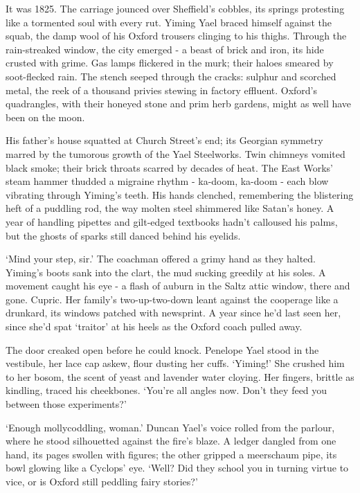 It was 1825. The carriage jounced over Sheffield's cobbles, its springs protesting like a tormented soul with every rut. Yiming Yael braced himself against the squab, the damp wool of his Oxford trousers clinging to his thighs. Through the rain-streaked window, the city emerged - a beast of brick and iron, its hide crusted with grime. Gas lamps flickered in the murk; their haloes smeared by soot-flecked rain. The stench seeped through the cracks: sulphur and scorched metal, the reek of a thousand privies stewing in factory effluent. Oxford's quadrangles, with their honeyed stone and prim herb gardens, might as well have been on the moon.

His father's house squatted at Church Street's end; its Georgian symmetry marred by the tumorous growth of the Yael Steelworks. Twin chimneys vomited black smoke; their brick throats scarred by decades of heat. The East Works' steam hammer thudded a migraine rhythm - ka-doom, ka-doom - each blow vibrating through Yiming's teeth. His hands clenched, remembering the blistering heft of a puddling rod, the way molten steel shimmered like Satan's honey. A year of handling pipettes and gilt-edged textbooks hadn't calloused his palms, but the ghosts of sparks still danced behind his eyelids.

`Mind your step, sir.' The coachman offered a grimy hand as they halted. Yiming's boots sank into the clart, the mud sucking greedily at his soles. A movement caught his eye - a flash of auburn in the Saltz attic window, there and gone. Cupric. Her family's two-up-two-down leant against the cooperage like a drunkard, its windows patched with newsprint. A year since he'd last seen her, since she'd spat `traitor' at his heels as the Oxford coach pulled away.

The door creaked open before he could knock. Penelope Yael stood in the vestibule, her lace cap askew, flour dusting her cuffs. `Yiming!' She crushed him to her bosom, the scent of yeast and lavender water cloying. Her fingers, brittle as kindling, traced his cheekbones. `You're all angles now. Don't they feed you between those experiments?'

`Enough mollycoddling, woman.' Duncan Yael's voice rolled from the parlour, where he stood silhouetted against the fire's blaze. A ledger dangled from one hand, its pages swollen with figures; the other gripped a meerschaum pipe, its bowl glowing like a Cyclops' eye. `Well? Did they school you in turning virtue to vice, or is Oxford still peddling fairy stories?'

